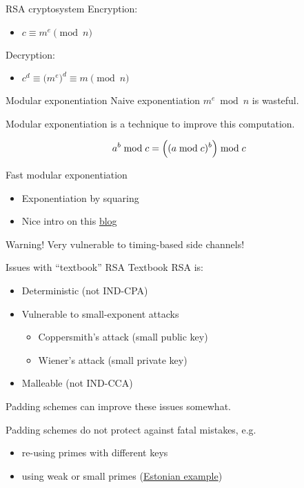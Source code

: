 \begin{frame}{RSA cryptosystem}
  Encryption:
  \pause
  \begin{itemize}
    \item $c \equiv m^e \pmod{n}$
  \end{itemize}

  \pause
  Decryption:
  \pause
  \begin{itemize}
    \item $c^d \equiv \bigl(m^e\bigr)^d \equiv m \pmod{n}$
  \end{itemize}
\end{frame}

\begin{frame}{Modular exponentiation}
  Naive exponentiation $m^e \bmod n$ is wasteful.

  \pause
  Modular exponentiation is a technique to improve this computation.

  \pause
  \[
    a^b \bmod c = \Bigl((a \bmod c)^b\Bigr) \bmod c
  \]

  \pause
  Fast modular exponentiation
  \begin{itemize}[<+(1)->]
    \item Exponentiation by squaring
    \item Nice intro on this \href{https://web.archive.org/web/20240303145251/https://dev-notes.eu/2019/12/Fast-Modular-Exponentiation/}{blog}
  \end{itemize}

  \pause
  \begin{block}{Warning!}
    Very vulnerable to timing-based side channels!
  \end{block}
  
\end{frame}

\begin{frame}{Issues with \enquote{textbook} RSA}
  Textbook RSA is:
  \begin{itemize}[<+(1)->]
    \item Deterministic (not IND-CPA)
    \item Vulnerable to small-exponent attacks
    \begin{itemize}
      \item Coppersmith's attack (small public key)
      \item Wiener's attack (small private key)
    \end{itemize}
    \item Malleable (not IND-CCA)
  \end{itemize}

  \pause
  Padding schemes can improve these issues somewhat.

  \pause
  Padding schemes do not protect against fatal mistakes, e.g.
  \begin{itemize}[<+(1)->]
    \item re-using primes with different keys
    \item using weak or small primes (\href{https://cybersec.ee/2017/10/18/rsa-2048-bit-keys-in-estonian-id-cards-issued-after-october-2014-are-factorizable/}{Estonian example})
  \end{itemize}
\end{frame}

